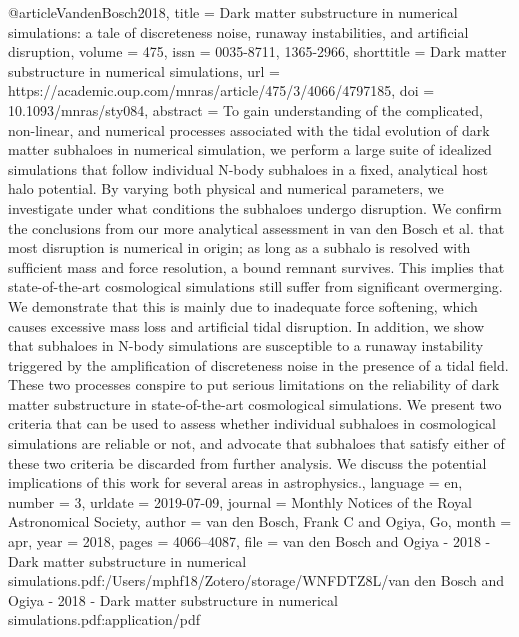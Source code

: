 {@article{VandenBosch2018,
	title = {Dark matter substructure in numerical simulations: a tale of discreteness noise, runaway instabilities, and artificial disruption},
	volume = {475},
	issn = {0035-8711, 1365-2966},
	shorttitle = {Dark matter substructure in numerical simulations},
	url = {https://academic.oup.com/mnras/article/475/3/4066/4797185},
	doi = {10.1093/mnras/sty084},
	abstract = {To gain understanding of the complicated, non-linear, and numerical processes associated with the tidal evolution of dark matter subhaloes in numerical simulation, we perform a large suite of idealized simulations that follow individual N-body subhaloes in a ﬁxed, analytical host halo potential. By varying both physical and numerical parameters, we investigate under what conditions the subhaloes undergo disruption. We conﬁrm the conclusions from our more analytical assessment in van den Bosch et al. that most disruption is numerical in origin; as long as a subhalo is resolved with sufﬁcient mass and force resolution, a bound remnant survives. This implies that state-of-the-art cosmological simulations still suffer from signiﬁcant overmerging. We demonstrate that this is mainly due to inadequate force softening, which causes excessive mass loss and artiﬁcial tidal disruption. In addition, we show that subhaloes in N-body simulations are susceptible to a runaway instability triggered by the ampliﬁcation of discreteness noise in the presence of a tidal ﬁeld. These two processes conspire to put serious limitations on the reliability of dark matter substructure in state-of-the-art cosmological simulations. We present two criteria that can be used to assess whether individual subhaloes in cosmological simulations are reliable or not, and advocate that subhaloes that satisfy either of these two criteria be discarded from further analysis. We discuss the potential implications of this work for several areas in astrophysics.},
	language = {en},
	number = {3},
	urldate = {2019-07-09},
	journal = {Monthly Notices of the Royal Astronomical Society},
	author = {van den Bosch, Frank C and Ogiya, Go},
	month = apr,
	year = {2018},
	pages = {4066--4087},
	file = {van den Bosch and Ogiya - 2018 - Dark matter substructure in numerical simulations.pdf:/Users/mphf18/Zotero/storage/WNFDTZ8L/van den Bosch and Ogiya - 2018 - Dark matter substructure in numerical simulations.pdf:application/pdf}
}


}
